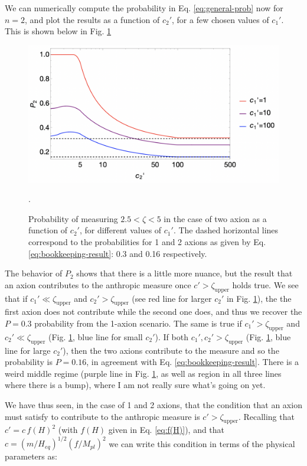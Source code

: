 \documentclass{article}
\begin{document}
We can numerically compute the probability in Eq. \eqref{eq:general-prob} now for $n=2$, and plot the results as a function of $c_2'$, for a few chosen values of $c_1'$. This is shown below in Fig. \ref{fig:2axion-prob}

\begin{figure}[h]
    \includegraphics[scale=0.5]{figs/2axion-prob.jpeg}
    \centering
    \caption{Probability of measuring $2.5<\zeta<5$ in the case of two axion as a function of $c_2'$, for different values of $c_1'$. The dashed horizontal lines correspond to the probabilities for 1 and 2 axions as given by Eq. \eqref{eq:bookkeeping-result}: 0.3 and 0.16 respectively.}.
    \label{fig:2axion-prob}
\end{figure}

The behavior of $P_2$ shows that there is a little more nuance, but the result that an axion contributes to the anthropic measure once $c'>\zeta_\text{upper}$ holds true. We see that if $c_1'\ll\zeta_\text{upper}$ and $c_2'>\zeta_\text{upper}$ (see red line for larger $c_2'$ in Fig. \ref{fig:2axion-prob}), the the first axion does not contribute while the second one does, and thus we recover the $P=0.3$ probability from the 1-axion scenario. The same is true if $c_1'>\zeta_\text{upper}$ and $c_2'\ll\zeta_\text{upper}$ (Fig. \ref{fig:2axion-prob}, blue line for small $c_2'$). If both $c_1',c_2'>\zeta_\text{upper}$ (Fig. \ref{fig:2axion-prob}, blue line for large $c_2'$), then the two axions contribute to the measure and so the probability is $P=0.16$, in agreement with Eq. \eqref{eq:bookkeeping-result}. There is a weird middle regime (purple line in Fig. \ref{fig:2axion-prob}, as well as region in all three lines where there is a bump), where I am not really sure what's going on yet. 

We have thus seen, in the case of 1 and 2 axions, that the condition that an axion must satisfy to contribute to the anthropic measure is $c'>\zeta_\text{upper}$. Recalling that $c'=c\,f(H)^2$ (with $f(H)$ given in Eq. \eqref{eq:f(H)}), and that $c=(m/H_{eq})^{1/2}(f/M_{pl})^2$ we can write this condition in terms of the physical parameters as:
\end{document}
